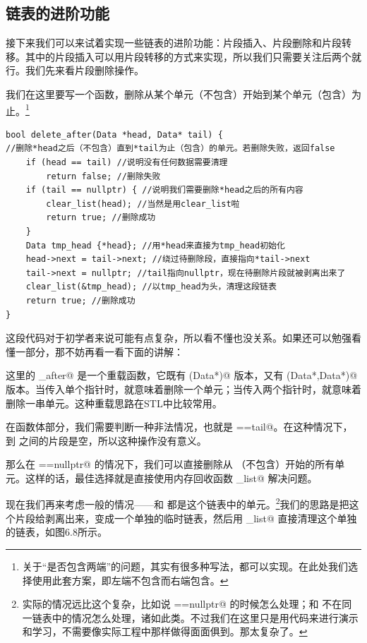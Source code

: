 \subsection*{链表的进阶功能}
接下来我们可以来试着实现一些链表的进阶功能：片段插入、片段删除和片段转移。其中的片段插入可以用片段转移的方式来实现，所以我们只需要关注后两个就行。我们先来看片段删除操作。\par
我们在这里要写一个函数，删除从某个单元（不包含）开始到某个单元（包含）为止。\footnote{关于``是否包含两端''的问题，其实有很多种写法，都可以实现。在此处我们选择使用此套方案，即左端不包含而右端包含。}
\begin{lstlisting}
bool delete_after(Data *head, Data* tail) {
//删除*head之后（不包含）直到*tail为止（包含）的单元。若删除失败，返回false
    if (head == tail) //说明没有任何数据需要清理
        return false; //删除失败
    if (tail == nullptr) { //说明我们需要删除*head之后的所有内容
        clear_list(head); //当然是用clear_list啦
        return true; //删除成功
    }
    Data tmp_head {*head}; //用*head来直接为tmp_head初始化
    head->next = tail->next; //绕过待删除段，直接指向*tail->next
    tail->next = nullptr; //tail指向nullptr，现在待删除片段就被剥离出来了
    clear_list(&tmp_head); //以tmp_head为头，清理这段链表
    return true; //删除成功
}
\end{lstlisting}
这段代码对于初学者来说可能有点复杂，所以看不懂也没关系。如果还可以勉强看懂一部分，那不妨再看一看下面的讲解：\par
这里的 \lstinline@delete_after@ 是一个重载函数，它既有 \lstinline@(Data*)@ 版本，又有 \lstinline@(Data*,Data*)@ 版本。当传入单个指针时，就意味着删除一个单元；当传入两个指针时，就意味着删除一串单元。这种重载思路在STL中比较常用。\par
在函数体部分，我们需要判断一种非法情况，也就是 \lstinline@head==tail@。在这种情况下，\lstinline@head@ 到 \lstinline@tail@ 之间的片段是空，所以这种操作没有意义。\par
那么在 \lstinline@tail==nullptr@ 的情况下，我们可以直接删除从 \lstinline@head@（不包含）开始的所有单元。这样的话，最佳选择就是直接使用内存回收函数 \lstinline@clear_list@ 解决问题。\par
现在我们再来考虑一般的情况——\lstinline@head@ 和 \lstinline@tail@ 都是这个链表中的单元。\footnote{实际的情况远比这个复杂，比如说 \lstinline@head==nullptr@ 的时候怎么处理；\lstinline@head@ 和 \lstinline@tail@ 不在同一链表中的情况怎么处理，诸如此类。不过我们在这里只是用代码来进行演示和学习，不需要像实际工程中那样做得面面俱到。那太复杂了。}我们的思路是把这个片段给剥离出来，变成一个单独的临时链表，然后用 \lstinline@clear_list@ 直接清理这个单独的链表，如图6.8所示。\par
